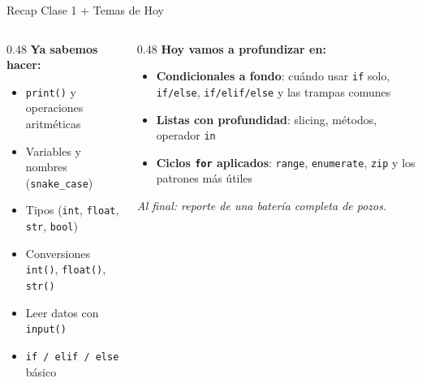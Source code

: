 \documentclass[aspectratio=169, 11pt]{beamer}
\begin{document}
\begin{frame}{Recap Clase 1 + Temas de Hoy}
  \vspace{-6pt}
  \begin{columns}[T]
    \begin{column}{0.48\textwidth}
      {\small\color{arcaDark}\bfseries\faCheckCircle\hspace{5pt}Ya sabemos hacer:}
      \vspace{4pt}
      {\footnotesize\color{textMuted}
      \begin{itemize}\setlength{\itemsep}{3pt}
        \item[{\color{codeGreen}\scriptsize\faCheck}]
          \texttt{print()} y operaciones aritméticas
        \item[{\color{codeGreen}\scriptsize\faCheck}]
          Variables y nombres (\texttt{snake\_case})
        \item[{\color{codeGreen}\scriptsize\faCheck}]
          Tipos (\texttt{int}, \texttt{float}, \texttt{str}, \texttt{bool})
        \item[{\color{codeGreen}\scriptsize\faCheck}]
          Conversiones \texttt{int()}, \texttt{float()}, \texttt{str()}
        \item[{\color{codeGreen}\scriptsize\faCheck}]
          Leer datos con \texttt{input()}
        \item[{\color{codeGreen}\scriptsize\faCheck}]
          \texttt{if / elif / else} básico
      \end{itemize}
      }
    \end{column}

    \begin{column}{0.48\textwidth}
      {\small\color{arcaDark}\bfseries\faForward\hspace{5pt}Hoy vamos a profundizar en:}
      \vspace{4pt}
      {\footnotesize\color{textMuted}
      \begin{itemize}\setlength{\itemsep}{3pt}
        \item[{\color{arcaRed}\scriptsize\faArrowRight}]
          \textbf{Condicionales a fondo}: cuándo usar
          \texttt{if} solo, \texttt{if/else},
          \texttt{if/elif/else} y las trampas comunes
        \item[{\color{arcaRed}\scriptsize\faArrowRight}]
          \textbf{Listas con profundidad}:
          slicing, métodos, operador \texttt{in}
        \item[{\color{arcaRed}\scriptsize\faArrowRight}]
          \textbf{Ciclos \texttt{for} aplicados}:
          \texttt{range}, \texttt{enumerate}, \texttt{zip}
          y los patrones más útiles
      \end{itemize}
      }

      \vspace{6pt}
      {\scriptsize\color{arcaDark}\itshape
        Al final: reporte de una batería completa de pozos.}
    \end{column}
  \end{columns}
\end{frame}
\end{document}

